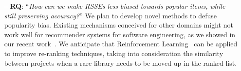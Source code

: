 \begin{itemize}

	\item[--] \textbf{RQ}: ``\emph{How can we make RSSEs less biased towards popular items, while still preserving accuracy?}'' We plan to develop novel methods to defuse popularity bias. Existing mechanisms conceived for other domains might not work well for recommender systems for software engineering, as we showed in our recent work~\cite{10174041}. We anticipate that Reinforcement Learning~\cite{DBLP:books/lib/SuttonB98} can be applied to improve re-ranking techniques, taking into consideration the similarity between projects when a rare library needs to be moved up in the ranked list. %
	
\end{itemize}



